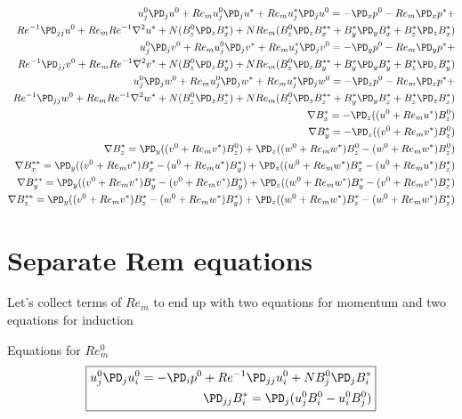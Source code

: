 \documentclass[11pt]{article}
\begin{document}
\begin{equation}\begin{aligned}
u_j^0 \PD_j u^0 + Re_m u_j^0 \PD_j u^* + Re_m u_j^* \PD_j u^0 = -\PD_x p^0 - Re_m\PD_x p^*+ \\ Re^{-1} \PD_{jj} u^0 + Re_m Re^{-1} \nabla^2 u^* + N (B_z^0 \PD_z B_x^*) + N Re_m ( B_z^0 \PD_z B_x^{**} + B_y^* \PD_y B_x^* + B_z^* \PD_z B_x^* ) \\
u_j^0 \PD_j v^0 + Re_m u_j^0 \PD_j v^* + Re_m u_j^* \PD_j v^0 = -\PD_y p^0 - Re_m\PD_y p^*+ \\ Re^{-1} \PD_{jj} v^0 + Re_m Re^{-1} \nabla^2 v^* + N (B_z^0 \PD_z B_y^*) + N Re_m ( B_z^0 \PD_z B_y^{**} + B_y^* \PD_y B_y^* + B_z^* \PD_z B_y^* ) \\
u_j^0 \PD_j w^0 + Re_m u_j^0 \PD_j w^* + Re_m u_j^* \PD_j w^0 = -\PD_z p^0 - Re_m\PD_z p^*+ \\ Re^{-1} \PD_{jj} w^0 + Re_m Re^{-1} \nabla^2 w^* + N (B_z^0 \PD_z B_z^*) + N Re_m ( B_z^0 \PD_z B_z^{**} + B_y^* \PD_y B_z^* + B_z^* \PD_z B_z^* ) \\
\nabla B_x^{*}  =-\PD_z ((u^0+Re_m u^*) B_z^{0}) \\
\nabla B_y^{*}  =-\PD_z ((v^0+Re_m v^*) B_z^{0}) \\
\nabla B_z^{*}  = \PD_y ((v^0+Re_m v^*) B_z^{0}) + \PD_z ((w^0+Re_m w^*) B_z^{0} - (w^0+Re_m w^*) B_z^{0}) \\
\nabla B_x^{**} = \PD_y ((v^0+Re_m v^*) B_x^{*} - (u^0+Re_m u^*) B_y^{*}) + \PD_z ((w^0+Re_m w^*) B_x^{*} - (u^0+Re_m u^*) B_z^{*}) \\
\nabla B_y^{**} = \PD_y ((v^0+Re_m v^*) B_y^{*} - (v^0+Re_m v^*) B_y^{*}) + \PD_z ((w^0+Re_m w^*) B_y^{*} - (v^0+Re_m v^*) B_z^{*}) \\
\nabla B_z^{**} = \PD_y ((v^0+Re_m v^*) B_z^{*} - (w^0+Re_m w^*) B_y^{*}) + \PD_z ((w^0+Re_m w^*) B_z^{*} - (w^0+Re_m w^*) B_z^{*}) \\
\end{aligned}\end{equation}

\section{Separate Rem equations}

Let's collect terms of $Re_m$ to end up with two equations for momentum and two equations for induction

Equations for $Re_m^0$
\begin{equation}\boxed{\begin{aligned}
u_j^0 \PD_j u_i^0 = -\PD_i p^0 + Re^{-1} \PD_{jj} u_i^0 + N B_j^0 \PD_j B_i^* \\
\PD_{jj} B_i^* = \PD_j ( u_j^0 B_i^0 - u_i^0 B_j^0)
\end{aligned}}\end{equation}
\end{document}
